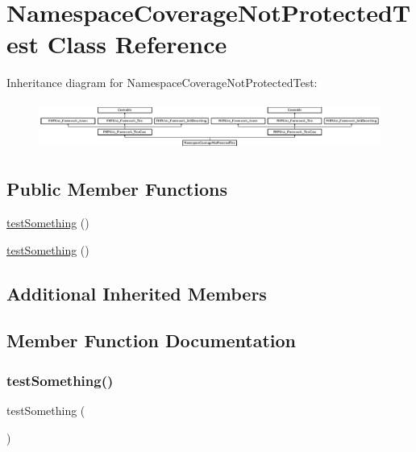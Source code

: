 \hypertarget{class_namespace_coverage_not_protected_test}{}\section{Namespace\+Coverage\+Not\+Protected\+Test Class Reference}
\label{class_namespace_coverage_not_protected_test}
Inheritance diagram for Namespace\+Coverage\+Not\+Protected\+Test\+:\begin{figure}[H]
\begin{center}
\leavevmode
\includegraphics[height=1.568627cm]{class_namespace_coverage_not_protected_test}
\end{center}
\end{figure}
\subsection*{Public Member Functions}
\begin{DoxyCompactItemize}
\item 
\mbox{\hyperlink{class_namespace_coverage_not_protected_test_a0fc4e17369bc9607ebdd850d9eda8167}{test\+Something}} ()
\item 
\mbox{\hyperlink{class_namespace_coverage_not_protected_test_a0fc4e17369bc9607ebdd850d9eda8167}{test\+Something}} ()
\end{DoxyCompactItemize}
\subsection*{Additional Inherited Members}


\subsection{Member Function Documentation}
\mbox{\label{class_namespace_coverage_not_protected_test_a0fc4e17369bc9607ebdd850d9eda8167}} 
\subsubsection{\texorpdfstring{test\+Something()}{testSomething()}\hspace{0.1cm}{\footnotesize\ttfamily [1/2]}}
{\footnotesize\ttfamily test\+Something (\begin{DoxyParamCaption}{ }\end{DoxyParamCaption})}

